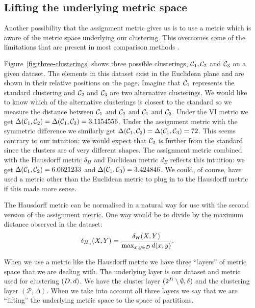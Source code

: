 \subsection{Lifting the underlying metric space}
\label{sec:lifting-metric-space}



Another possibility that the assignment metric gives us is to use a metric
which is aware of the metric space underlying our clustering.  This overcomes
some of the limitations that are present in most comparison methods
\citep{bae2010comparison}.

Figure~\ref{fig:three-clusterings} shows three possible clusterings,
$\mathcal{C}_1,\mathcal{C}_2$ and $\mathcal{C}_3$ on a given dataset.  The elements in this
dataset exist in the Euclidean plane and are shown in their relative positions
on the page.  Imagine that $\mathcal{C}_1$ represents the standard clustering and
$\mathcal{C}_2$ and $\mathcal{C}_3$ are two alternative clusterings.  We would like to
know which of the alternative clusterings is closest to the standard so we
measure the distance between $\mathcal{C}_1$ and $\mathcal{C}_2$ and $\mathcal{C}_1$ and
$\mathcal{C}_3$.  Under the VI metric we get $\Delta(\mathcal{C}_1,\mathcal{C}_2) =
\Delta(\mathcal{C}_1,\mathcal{C}_3) = 3.1154556$.  Under the assignment metric with the
symmetric difference we similarly get $\Delta(\mathcal{C}_1,\mathcal{C}_2) =
\Delta(\mathcal{C}_1,\mathcal{C}_3) = 72$.  This seems contrary to our intuition: we would
expect that $\mathcal{C}_2$ is further from the standard since the clusters are of
very different shapes.  The assignment metric combined with the Hausdorff
metric $\delta_{H}$ and Euclidean metric $d_E$ reflects this intuition: we get
$\Delta(\mathcal{C}_1,\mathcal{C}_2) = 6.0621233$ and $\Delta(\mathcal{C}_1,\mathcal{C}_3) =
3.424846$.  We could, of course, have used a metric other than the Euclidean
metric to plug in to the Hausdorff metric if this made more sense.

The Hausdorff metric can be normalised in a natural way for use with the
second version of the assignment metric.  One way would be to divide by the
maximum distance observed in the dataset:
\begin{equation*}
  \delta_{H_n}(X,Y) = \frac{\delta_{H}(X,Y)}{\max_{x,y \in D} d(x,y)}.
\end{equation*}

When we use a metric like the Hausdorff metric we have three ``layers'' of
metric space that we are dealing with.  The underlying layer is our dataset
and metric used for clustering $(D, d)$.  We have the cluster layer
$(2^{D} \setminus \emptyset,\delta)$ and the clustering layer
$(\mathcal{P},\Delta)$.  When we take into account all three layers we say
that we are ``lifting'' the underlying metric space to the space of
partitions.

